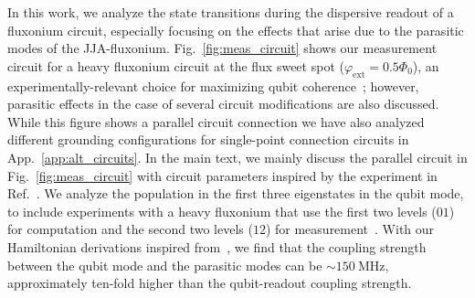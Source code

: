 \documentclass[%
reprint,
superscriptaddress,
 amsmath,amssymb,
 aps,
 prx,
longbibliography,
floatfix,
]{revtex4-2}
\begin{document}
In this work, we analyze the state transitions during the dispersive readout of a fluxonium circuit, especially focusing on the effects that arise due to the parasitic modes of the JJA-fluxonium. Fig.~\ref{fig:meas_circuit} shows our measurement circuit for a heavy fluxonium circuit at the flux sweet spot  ($\varphi_\mathrm{ext}=0.5\Phi_0$), an experimentally-relevant choice for maximizing qubit coherence~\cite{somoroff_millisecond_2023,nguyen2019high,zhang_universal_2021,manucharyan2009fluxonium}; however, parasitic effects in the case of several circuit modifications are also discussed. While this figure shows a parallel circuit connection we have also analyzed different grounding configurations for single-point connection circuits in App.~\ref{app:alt_circuits}. In the main text, we mainly discuss the parallel circuit in Fig.~\ref{fig:meas_circuit} with circuit parameters inspired by the experiment in Ref.~\cite{zhang_universal_2021}. We analyze the population in the first three eigenstates in the qubit mode, to include experiments with a heavy fluxonium that use the first two levels ($01$) for computation and the second two levels ($12$) for measurement~\cite{zhang_universal_2021}. %
With our Hamiltonian derivations inspired from~\cite{viola2015collective}, we find that the coupling strength between the qubit mode and the parasitic modes can be $\sim 150 \ \mathrm{MHz}$, approximately ten-fold higher than the qubit-readout coupling strength. %
\end{document}
